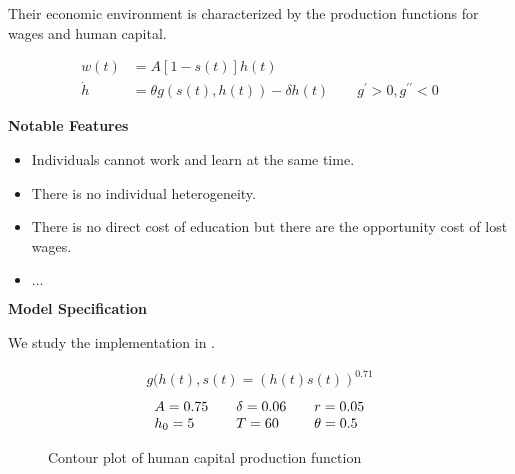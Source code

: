 \begin{frame}
Their economic environment is characterized by the production functions for wages and human capital.

\begin{align*}
w(t)    & = A[1 - s(t)]h(t) \\
\dot{h} & = \theta g(s(t),h(t)) - \delta h(t) \qquad g^\prime > 0, g^{\prime\prime} < 0
\end{align*}

\end{frame}
\begin{frame}\textbf{Notable Features}\vspace{0.3cm}

\begin{itemize}\setlength\itemsep{1em}
\item Individuals cannot work and learn at the same time.
\item There is no individual heterogeneity.
\item There is no direct cost of education but there are the opportunity cost of lost wages.
\item $\hdots$
\end{itemize}

\end{frame}
\begin{frame}\textbf{Model Specification}\vspace{0.3cm}

We study the implementation in .

\begin{align*}
	g(h(t), s(t) = \left(h(t) s(t)\right)^{0.71}
\end{align*}\vspace{-1.0cm}
\begin{align*}\begin{array}{l@{\qquad}l@{\qquad}l}
	A = 0.75 & \delta = 0.06 & r = 0.05\\
	h_0 = 5 & T = 60 & \theta = 0.5
\end{array}\end{align*}
\end{frame}

\begin{frame}\begin{figure}[htp]\centering
\caption{Contour plot of human capital production function}
\end{figure}\end{frame}

